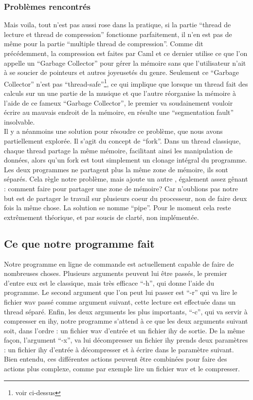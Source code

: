 \documentclass[a4paper,12pt]{article}
\begin{document}
		\subsubsection{Problèmes rencontrés}
Mais voila, tout n'est pas aussi rose dans la pratique, si la partie ``thread de
lecture et thread de compression'' fonctionne parfaitement, il n'en est pas de
même pour la partie ``multiple thread de compression''. Comme dit précédemment,
la compression est faites par Caml et ce dernier utilise ce que l'on appelle un
``Garbage Collector'' pour gérer la mémoire sans que l'utilisateur n'ait à se
soucier de pointeurs et autres joyeusetés du genre. Seulement ce ``Garbage
Collector'' n'est pas ``thread-safe''\footnote{voir ci-dessus}, ce qui implique
que lorsque un thread fait des calculs sur un une partie de la musique et que
l'autre réorganise la mémoire à l'aide de ce fameux ``Garbage Collector'', le
premier va soudainement vouloir écrire au mauvais endroit de la mémoire, en
résulte une ``segmentation fault'' insolvable.\\
Il y a néanmoins une solution pour résoudre ce problème, que nous avons
partiellement explorée. Il s'agit du concept de ``fork''. Dans un thread
classique, chaque thread partage la même mémoire, facilitant ainsi les
manipulation de données, alors qu'un fork est tout simplement un clonage
intégral du programme. Les deux programmes ne partagent plus la même zone de
mémoire, ils sont séparés. Cela règle notre problème, mais ajoute un autre
, également assez gênant : comment faire pour partager une zone de
mémoire? Car n'oublions pas notre but est de partager le travail sur plusieurs
coeur du processeur, non de faire deux fois la même chose. La solution se
nomme ``pipe''.  Pour le moment cela reste extrêmement théorique, et par soucis
de clarté, non implémentée.\\

\newpage

	\subsection{Ce que notre programme fait}
Notre programme en ligne de commande est actuellement capable de faire de
nombreuses choses. Plusieurs arguments peuvent lui être passés, le premier
d'entre eux est le classique, mais très efficace ``-h'', qui donne l'aide du
programme. Le second argument que l'on peut lui passer est ``-r'' qui va lire le
fichier wav passé comme argument suivant, cette lecture est effectuée dans un
thread séparé. Enfin, les deux arguments les
plus importants, ``-c'', qui va servir à compresser en ihy, notre programme
s'attend à ce que les deux arguments suivant soit, dans
l'ordre : un fichier wav d'entrée et un fichier ihy de sortie. De la même façon,
l'argument ``-x'', va lui décompresser un fichier ihy prends deux paramètres :
un fichier ihy d'entrée à décompresser et à écrire dans le paramètre suivant.\\
Bien entendu, ces différentes actions peuvent être combinées pour faire des
actions plus complexe, comme par exemple lire un fichier wav et le
compresser.
\end{document}
